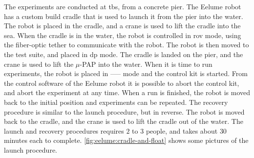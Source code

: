 The experiments are conducted at \gls{tbs}, from a concrete pier. The Eelume 
robot has a custom build cradle that is used to launch it from the pier into the water. The
robot is placed in the cradle, and a crane is used to lift the cradle into the sea.
When the cradle is in the water, the robot is controlled in \gls{rov} mode, using
the fiber-optic tether to communicate with the robot. The robot is then moved to the test suite,
and placed in \gls{dp} mode. The cradle is landed on the pier, and the crane is used to lift the
\(\mu\)-PAP into the water. When it is time to run experiments, the robot is placed in
----- mode and the control kit is started. From the control software of the Eelume
robot it is possible to abort the control kit, and abort the experiment at any time.
When a run is finished, the robot is moved back to the initial position and experiments can be repeated.
The recovery procedure is similar to the launch procedure, but in reverse. The robot
is moved back to the cradle, and the crane is used to lift the cradle out of the water.
The launch and recovery procedures requires \(2\) to \(3\) people, and takes about \(30\) minutes each to complete.
\autoref{fig:eelume:cradle-and-float} shows some pictures of the launch procedure.

